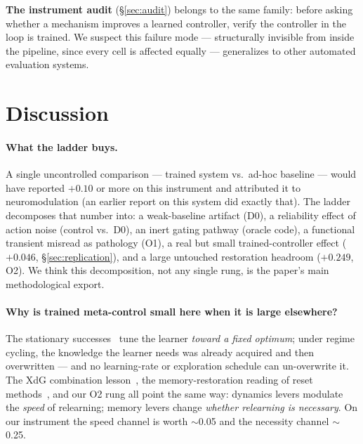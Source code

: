\documentclass[11pt]{article}
\begin{document}
\textbf{The instrument audit} (\S\ref{sec:audit}) belongs to the same family:
before asking whether a mechanism improves a learned controller, verify the
controller in the loop is trained. We suspect this failure mode ---
structurally invisible from inside the pipeline, since every cell is affected
equally --- generalizes to other automated evaluation systems.

\section{Discussion}
\label{sec:discussion}

\paragraph{What the ladder buys.}
A single uncontrolled comparison --- trained system vs.\ ad-hoc baseline ---
would have reported $+0.10$ or more on this instrument and attributed it to
neuromodulation (an earlier report on this system did exactly that). The
ladder decomposes that number into: a weak-baseline artifact (D0), a
reliability effect of action noise (control vs.\ D0), an inert gating pathway
(oracle code), a functional transient misread as pathology (O1), a real but
small trained-controller effect ($+0.046$, \S\ref{sec:replication}), and a
large untouched restoration headroom ($+0.249$, O2). We think this
decomposition, not any single rung, is the paper's main methodological
export.

\paragraph{Why is trained meta-control small here when it is large elsewhere?}
The stationary successes~\citep{xu2018metagradient,zahavy2020stac} tune the
learner \emph{toward a fixed optimum}; under regime cycling, the knowledge
the learner needs was already acquired and then overwritten --- and no
learning-rate or exploration schedule can un-overwrite it. The XdG
combination lesson~\citep{masse2018xdg}, the memory-restoration reading of
reset methods~\citep{klein2024plasticitysurvey}, and our O2 rung all point the
same way: dynamics levers modulate the \emph{speed} of relearning; memory
levers change \emph{whether relearning is necessary}. On our instrument the
speed channel is worth $\sim$0.05 and the necessity channel $\sim$0.25.
\end{document}
